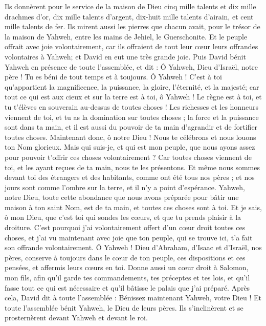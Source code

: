\begin{multicols}{2}
Ils donnèrent pour le service de la maison de Dieu cinq mille talents et dix mille drachmes d'or, dix mille talents d'argent, dix-huit mille talents d'airain, et cent mille talents de fer.
Ils mirent aussi les pierres que chacun avait, pour le trésor de la maison de Yahweh, entre les mains de Jehiel, le Guerschonite.
Et le peuple offrait avec joie volontairement, car ils offraient de tout leur cœur leurs offrandes volontaires à Yahweh; et David en eut une très grande joie.
Puis David bénit Yahweh en présence de toute l'assemblée, et dit : Ô Yahweh, Dieu d'Israël, notre père ! Tu es béni de tout temps et à toujours.
Ô Yahweh ! C’est à toi qu'appartient la magnificence, la puissance, la gloire, l'éternité, et la majesté; car tout ce qui est aux cieux et sur la terre est à toi, ô Yahweh ! Le règne est à toi, et tu t'élèves en souverain au-dessus de toutes choses !
Les richesses et les honneurs viennent de toi, et tu as la domination sur toutes choses ; la force et la puissance sont dans ta main, et il est aussi du pouvoir de ta main d'agrandir et de fortifier toutes choses.
Maintenant donc, ô notre Dieu ! Nous te célébrons et nous louons ton Nom glorieux.
Mais qui suis-je, et qui est mon peuple, que nous ayons assez pour pouvoir t’offrir ces choses volontairement ? Car toutes choses viennent de toi, et les ayant reçues de ta main, nous te les présentons.
Et même nous sommes devant toi des étrangers et des habitants, comme ont été tous nos pères ; et nos jours sont comme l'ombre sur la terre, et il n'y a point d’espérance.
Yahweh, notre Dieu,  toute cette abondance que nous avons préparée pour bâtir une maison à ton saint Nom, est de ta main, et toutes ces choses sont à toi.
Et je sais, ô mon Dieu, que c'est toi qui sondes les cœurs, et que tu prends plaisir à la droiture. C'est pourquoi j'ai volontairement offert d'un cœur droit toutes ces choses, et j'ai vu maintenant avec joie que ton peuple, qui se trouve ici, t'a fait son offrande volontairement.
Ô Yahweh ! Dieu d'Abraham, d'Isaac et d'Israël, nos pères, conserve à toujours dans le cœur de ton peuple, ces dispositions et ces pensées, et affermis leurs cœurs en toi.
Donne aussi un cœur droit à Salomon, mon fils, afin qu'il garde tes commandements, tes préceptes et tes lois, et qu'il fasse tout ce qui est nécessaire et qu'il bâtisse le palais que j'ai préparé.
Après cela, David dit à toute l'assemblée : Bénissez maintenant Yahweh, votre Dieu ! Et toute l'assemblée bénit Yahweh, le Dieu de leurs pères. Ils s'inclinèrent et se prosternèrent devant Yahweh et devant le roi.

\end{multicols}
